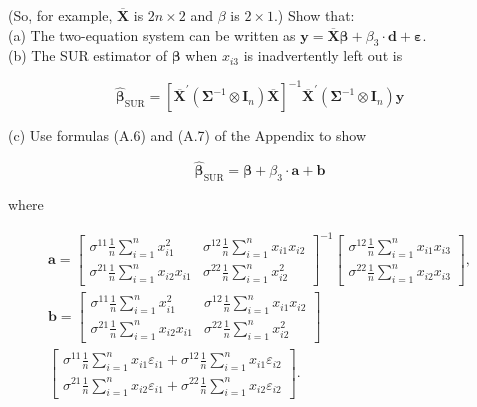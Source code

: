 \documentclass[10pt]{article}
\begin{document}
(So, for example, $\overline{\mathbf{X}}$ is $2 n \times 2$ and $\beta$ is $2 \times 1$.) Show that:\\
(a) The two-equation system can be written as $\mathbf{y}=\overline{\mathbf{X}} \boldsymbol{\beta}+\beta_{3} \cdot \mathbf{d}+\boldsymbol{\varepsilon}$.\\
(b) The SUR estimator of $\boldsymbol{\beta}$ when $x_{i 3}$ is inadvertently left out is

$$
\widehat{\boldsymbol{\beta}}_{\mathrm{SUR}}=\left[\overline{\mathbf{X}}^{\prime}\left(\boldsymbol{\Sigma}^{-1} \otimes \mathbf{I}_{n}\right) \overline{\mathbf{X}}\right]^{-1} \overline{\mathbf{X}}^{\prime}\left(\boldsymbol{\Sigma}^{-1} \otimes \mathbf{I}_{n}\right) \mathbf{y}
$$

(c) Use formulas (A.6) and (A.7) of the Appendix to show

$$
\widehat{\boldsymbol{\beta}}_{\mathrm{SUR}}=\boldsymbol{\beta}+\beta_{3} \cdot \mathbf{a}+\mathbf{b}
$$

where

$$
\begin{array}{r}
\mathbf{a}=\left[\begin{array}{cc}
\sigma^{11} \frac{1}{n} \sum_{i=1}^{n} x_{i 1}^{2} & \sigma^{12} \frac{1}{n} \sum_{i=1}^{n} x_{i 1} x_{i 2} \\
\sigma^{21} \frac{1}{n} \sum_{i=1}^{n} x_{i 2} x_{i 1} & \sigma^{22} \frac{1}{n} \sum_{i=1}^{n} x_{i 2}^{2}
\end{array}\right]^{-1}\left[\begin{array}{r}
\sigma^{12} \frac{1}{n} \sum_{i=1}^{n} x_{i 1} x_{i 3} \\
\sigma^{22} \frac{1}{n} \sum_{i=1}^{n} x_{i 2} x_{i 3}
\end{array}\right], \\
\mathbf{b}=\left[\begin{array}{cc}
\sigma^{11} \frac{1}{n} \sum_{i=1}^{n} x_{i 1}^{2} & \sigma^{12} \frac{1}{n} \sum_{i=1}^{n} x_{i 1} x_{i 2} \\
\sigma^{21} \frac{1}{n} \sum_{i=1}^{n} x_{i 2} x_{i 1} & \sigma^{22} \frac{1}{n} \sum_{i=1}^{n} x_{i 2}^{2}
\end{array}\right] \\
{\left[\begin{array}{c}
\sigma^{11} \frac{1}{n} \sum_{i=1}^{n} x_{i 1} \varepsilon_{i 1}+\sigma^{12} \frac{1}{n} \sum_{i=1}^{n} x_{i 1} \varepsilon_{i 2} \\
\sigma^{21} \frac{1}{n} \sum_{i=1}^{n} x_{i 2} \varepsilon_{i 1}+\sigma^{22} \frac{1}{n} \sum_{i=1}^{n} x_{i 2} \varepsilon_{i 2}
\end{array}\right] .}
\end{array}
$$
\end{document}
